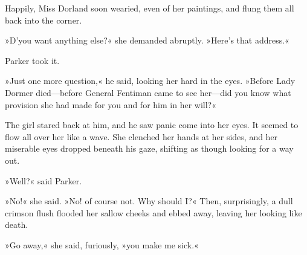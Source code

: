 Happily, Miss Dorland soon wearied, even of her paintings, and flung them all back into the corner.

»D'you want anything else?« she demanded abruptly. »Here's that address.«

Parker took it.

»Just one more question,« he said, looking her hard in the eyes. »Before Lady Dormer died\allowbreak---\allowbreak before General Fentiman came to see her\allowbreak---\allowbreak did you know what provision she had made for you and for him in her will?«

The girl stared back at him, and he saw panic come into her eyes. It seemed to flow all over her like a wave. She clenched her hands at her sides, and her miserable eyes dropped beneath his gaze, shifting as though looking for a way out.

»Well?« said Parker.

»No!« she said. »No! of course not. Why should I?« Then, surprisingly, a dull crimson flush flooded her sallow cheeks and ebbed away, leaving her looking like death.

»Go away,« she said, furiously, »you make me sick.«